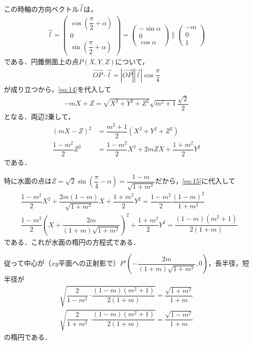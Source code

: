 \documentclass[../../main.tex]{subfiles}
\begin{document}
この時軸の方向ベクトル$\vec{l}$は，
\begin{align}
  \vec{l} =
  \begin{pmatrix}\cos\left(\dfrac{\pi}{2}+\alpha\right)\\0\\\sin\left(\dfrac{\pi}{2}+\alpha\right)
  \end{pmatrix}
  =
  \begin{pmatrix}-\sin\alpha\\0\\\cos\alpha
  \end{pmatrix}
  \parallel
  \begin{pmatrix}-m\\0\\1
  \end{pmatrix} \label{eq:14}
\end{align}
である．円錐側面上の点$P(X,Y,Z)$について，
\begin{align}
  \overrightarrow{OP}\cdot\vec{l} = |\overrightarrow{OP}||\vec{l}|\cos\dfrac{\pi}{4}
\end{align}
が成り立つから，\cref{eq:14}を代入して
\begin{align}
  -mX+Z = \sqrt{X^2+Y^2+Z^2}\sqrt{m^2+1}\dfrac{\sqrt{2}}{2}
\end{align}
となる．両辺2乗して，
\begin{align}
  (mX-Z)^2 &= \dfrac{m^2+1}{2}(X^2+Y^2+Z^2) \\
  \dfrac{1-m^2}{2}Z^2 &= \dfrac{1-m^2}{2}X^2+2mZX+\dfrac{1+m^2}{2}Y^2 \label{eq:15}
\end{align}
である．

特に水面の点は$Z=\sqrt{2}\sin\left(\dfrac{\pi}{4}-\alpha\right)=\dfrac{1-m}{\sqrt{1+m^2}}$だから，\cref{eq:15}に代入して
\begin{align}
  &\dfrac{1-m^2}{2}X^2+\dfrac{2m(1-m)}{\sqrt{1+m^2}}X+\dfrac{1+m^2}{2}Y^2 = \dfrac{1-m^2}{2}\dfrac{(1-m)^2}{1+m^2} \\
  &\dfrac{1-m^2}{2}\left(X+\dfrac{2m}{(1+m)\sqrt{1+m^2}}\right)^2+\dfrac{1+m^2}{2}Y^2 = \dfrac{(1-m)(m^2+1)}{2(1+m)}
\end{align}
である．これが水面の楕円の方程式である．

従って中心が（$xy$平面への正射影で）$P'\left(-\dfrac{2m}{(1+m)\sqrt{1+m^2}},0\right)$，長半径，短半径が
\begin{align}
  \sqrt{\dfrac{2}{1-m^2}\cdot\dfrac{(1-m)(m^2+1)}{2(1+m)}} = \dfrac{\sqrt{1+m^2}}{1+m}
\end{align}
\begin{align}
  \sqrt{\dfrac{2}{1+m^2}\cdot\dfrac{(1-m)(m^2+1)}{2(1+m)}} = \dfrac{\sqrt{1-m^2}}{1+m}
\end{align}
の楕円である．
\end{document}
